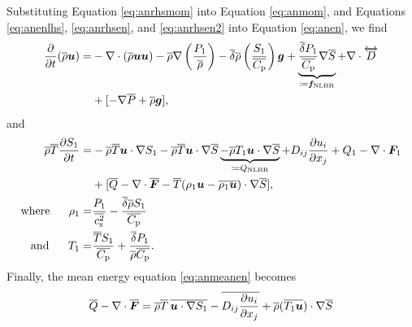 \documentclass[12pt]{article}
\newcommand{\vecf}{\bm{F}}
\begin{document}
Substituting Equation \eqref{eq:anrhsmom} into Equation \eqref{eq:anmom}, and Equations \eqref{eq:anenlhs}, \eqref{eq:anrhsen}, and \eqref{eq:anrhsen2} into Equation \eqref{eq:anen}, we find
	\begin{align}\label{eq:anmommod}
		\frac{\partial}{\partial t}(\overline{\rho}\bm{u})= &-\nabla\cdot(\overline{\rho}\bm{u}\bm{u}) -\overline{\rho}\nabla\left(\frac{P_1}{\overline{\rho}}\right) - \overline{\delta} \overline{\rho} \left(\frac{S_1}{\overline{C_{\rm{p}}}}\right) \bm{g} + \underbrace{\frac{\overline{\delta} P_1}{\overline{C_{\rm{p}}}} \nabla\overline{S}}_{\coloneqq \bm{f}_{\rm NLBR}}+\nabla\cdot \overleftrightarrow{D}\nonumber\\
		&+[-\nabla\overline{P} + \overline{\rho}\bm{g}],
	\end{align}
and
\begin{subequations}\label{eq:anenmod}
\begin{align}
	\rhoover\tmpover\pderiv{\entrone}{t}= &-\rhoover\tmpover\ugrad \entrone - \rhoover \tmpover \ugrad \entrover \underbrace{- \rhoover \tmpone\ugrad\entrover}_{\define Q_{\rm NLBR}}+D_{ij}\pderiv{u_i}{x_j} + Q _1- \Div\vecf_1  \nonumber\\
	& +[\heatover - \Div\overline{\vecf} - \tmpover(\rhoone\vecu-\overline{\rhoone\vecu})\cdot\nabla\entrover],\\
	\where \rhoone =& \frac{\prsone}{\cssqover}-\frac{\deltaover\rhoover \entrone}{\cpover}\\
	\andd \tmpone = & \frac{\tmpover \entrone}{\cpover} + \frac{\deltaover \prsone}{\rhoover\cpover}.
\end{align}
\end{subequations}
Finally, the mean energy equation \eqref{eq:anmeanen} becomes
\begin{align}\label{eq:anmeanen2}
	\heatover-\Div\overline{\vecf} = \rhoover\tmpover\, \overline{\ugrad \entrone}-\overline{D_{ij}\pderiv{u_i}{x_j}} + \rhoover (\overline{\tmpone\vecu})\dotgrad\entrover 
\end{align}
\end{document}
